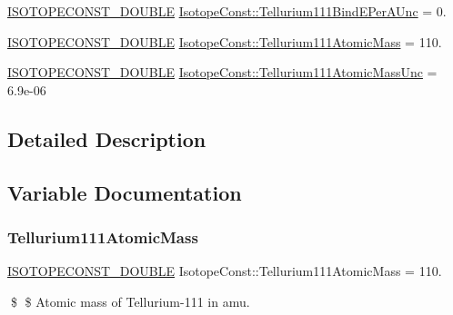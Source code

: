 \begin{DoxyCompactItemize}
\mbox{\hyperlink{group___isotope_const-_macros_ga8f45a7272ce02c0b4c65c44636ed719a}{I\+S\+O\+T\+O\+P\+E\+C\+O\+N\+S\+T\+\_\+\+D\+O\+U\+B\+LE}} \mbox{\hyperlink{group___isotope_const-_tellurium-_te111_ga605c6dc8ded8f9ca3bc9671c01db464c}{Isotope\+Const\+::\+Tellurium111\+Bind\+E\+Per\+A\+Unc}} = 0.
\item 
\mbox{\hyperlink{group___isotope_const-_macros_ga8f45a7272ce02c0b4c65c44636ed719a}{I\+S\+O\+T\+O\+P\+E\+C\+O\+N\+S\+T\+\_\+\+D\+O\+U\+B\+LE}} \mbox{\hyperlink{group___isotope_const-_tellurium-_te111_ga2af094e3d5b3c57800d82327b54f61c6}{Isotope\+Const\+::\+Tellurium111\+Atomic\+Mass}} = 110.
\item 
\mbox{\hyperlink{group___isotope_const-_macros_ga8f45a7272ce02c0b4c65c44636ed719a}{I\+S\+O\+T\+O\+P\+E\+C\+O\+N\+S\+T\+\_\+\+D\+O\+U\+B\+LE}} \mbox{\hyperlink{group___isotope_const-_tellurium-_te111_ga00d445d198b8bab3e4bd05108d6a3ed0}{Isotope\+Const\+::\+Tellurium111\+Atomic\+Mass\+Unc}} = 6.\+9e-\/06
\end{DoxyCompactItemize}


\subsection{Detailed Description}


\subsection{Variable Documentation}
\mbox{\label{group___isotope_const-_tellurium-_te111_ga2af094e3d5b3c57800d82327b54f61c6}} 
\subsubsection{\texorpdfstring{Tellurium111\+Atomic\+Mass}{Tellurium111AtomicMass}}
{\footnotesize\ttfamily \mbox{\hyperlink{group___isotope_const-_macros_ga8f45a7272ce02c0b4c65c44636ed719a}{I\+S\+O\+T\+O\+P\+E\+C\+O\+N\+S\+T\+\_\+\+D\+O\+U\+B\+LE}} Isotope\+Const\+::\+Tellurium111\+Atomic\+Mass = 110.}

\$ \$ Atomic mass of Tellurium-\/111 in amu. \mbox{\label{group___isotope_const-_tellurium-_te111_ga00d445d198b8bab3e4bd05108d6a3ed0}} 
